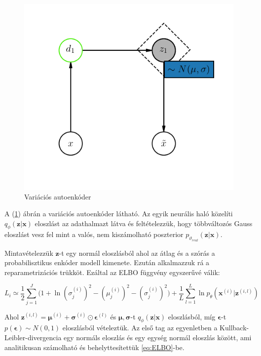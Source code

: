 \documentclass[12pt, english]{article}
\begin{document}
\vspace{4mm}

\begin{figure}[H]
    \centering
    \includegraphics[width=0.33\linewidth]{vae.png}
    \caption{Variációs autoenkóder}
    \label{fig:vae}
\end{figure}

\vspace{4mm}

\par A (\ref{fig:vae}) ábrán a variációs autoenkóder látható. Az egyik neurális haló közelíti $q_{\phi}(\bm{z} | \bm{x})$ eloszlást az adathalmazt látva és feltételezzük, hogy többváltozós Gauss eloszlást vesz fel mint a valós, nem kiszámolható poszterior $p_{\vartheta_{real}}(\bm{z} | \bm{x})$.

\vspace{4mm}

\par Mintavételezzük $\bm{z}$-t egy normál eloszlásból ahol az átlag és a szórás a probabilisztikus enkóder modell kimenete. Ezután alkalmazzuk rá a reparametrizációs trükköt. Ezáltal az ELBO függvény egyszerűvé válik:

\vspace{4mm}

\begin{equation}
    L_{i} \simeq \frac{1}{2}\sum_{j = 1}^{J}\Big( 1 + \ln(\sigma^{(i)}_{j})^{2} - (\mu^{(i)}_{j})^{2} - (\sigma^{(i)}_{j})^{2} \Big) + \frac{1}{L}\sum_{l=1}^{L}\ln p_{\theta}(\bm{x}^{(i)} | \bm{z}^{(i, l)})
    \label{eq:ELBO}
\end{equation}

\vspace{4mm}

\par Ahol $\bm{z}^{(i, l)} = \bm{\mu}^{(i)} + \bm{\sigma}^{(i)} \odot \bm{\epsilon}^{(l)}$ és $\bm{\mu}, \bm{\sigma}$-t $q_{\phi}(\bm{z} | \bm{x})$ eloszlásból, míg $\bm{\epsilon}$-t $p(\bm{\epsilon}) \sim N(0, 1)$ eloszlásból vételeztük. Az első tag az egyenletben a Kullback-Leibler-divergencia egy normáls eloszlás és egy egység normál eloszlás között, ami analitikusan számolható és behelyttesítettük \ref{eq:ELBO}-be.
\end{document}
